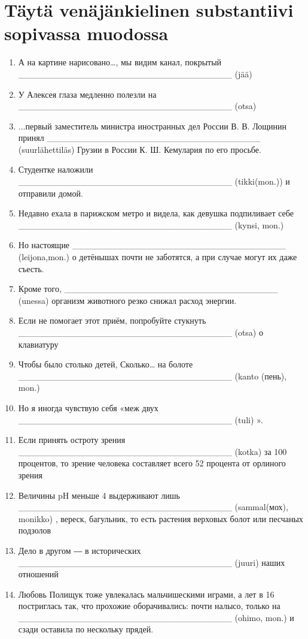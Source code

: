 \documentclass[paper=a4, fontsize=11pt]{scrartcl}
\begin{document}
\onehalfspacing

\section{Täytä venäjänkielinen substantiivi sopivassa muodossa}

\begin{enumerate}
    \item А на картине нарисовано…, мы видим канал, покрытый  __________________________________ (jää) 
    \item У Алексея глаза медленно полезли на  __________________________________ (otsa) 
    \item ...первый заместитель министра иностранных дел России В. В. Лощинин принял  __________________________________ (suurlähettiläs)  Грузии в России К. Ш. Кемулария по его просьбе.
    \item Студентке наложили  __________________________________ (tikki(mon.))  и отправили домой.
    \item Недавно ехала в парижском метро и видела, как девушка подпиливает себе  __________________________________ (kynsi, mon.) 
    \item Но настоящие  __________________________________ (leijona,mon.) о детёнышах почти не заботятся, а при случае могут их даже съесть.
    \item Кроме того,  __________________________________ (unessa) организм животного резко снижал расход энергии.
    \item Если не помогает этот приём, попробуйте стукнуть  __________________________________ (otsa)  о клавиатуру
    \item Чтобы было столько детей, Сколько… на болоте  __________________________________ (kanto (пень), mon.)  
    \item Но я иногда чувствую себя «меж двух  __________________________________ (tuli) ».
    \item Если принять остроту зрения  __________________________________ (kotka)  за 100 процентов, то зрение человека составляет всего 52 процента от орлиного зрения
    \item Величины pH меньше 4 выдерживают лишь  __________________________________ (sammal(мох), monikko) , вереск, багульник, то есть растения верховых болот или песчаных подзолов
    \item Дело в другом ― в исторических  __________________________________ (juuri)  наших отношений
    \item Любовь Полищук тоже увлекалась мальчишескими играми, а лет в 16 постриглась так, что прохожие оборачивались: почти налысо, только на  __________________________________ (ohimo, mon.)  и сзади оставила по нескольку прядей.
\end{enumerate}
\end{document}
